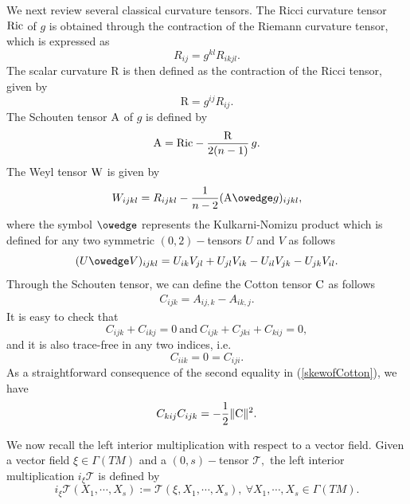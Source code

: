 \documentclass[10pt,leqno,oneside]{amsart}
\begin{document}
        We next review several classical curvature tensors. The Ricci curvature tensor $ {\rm Ric}$ of $g$ is obtained through the contraction of the Riemann curvature tensor, which is expressed as
        \[R_{ij}=g^{kl} R_{ikjl}.\]
        The scalar curvature \(\text{R}\) is then defined as the contraction of the Ricci tensor, given by
        \[\text{R}=g^{ij}R_{ij}.\]
        The Schouten tensor $ {\rm A}$ of $g$ is defined by
        \begin{equation*}
              {\rm A}={\rm Ric}-\frac{{\rm R}}{2(n-1)}\,g.
        \end{equation*}
        The Weyl tensor $\rm{W}$ is given by
                \begin{equation*}\label{decompofR}
                        W_{ijkl}=R_{i j k l} - \frac{1}{n-2}({\rm A}\owedge  g)_{ijkl},
                \end{equation*}
        where the symbol $\owedge$ represents the Kulkarni-Nomizu product which is defined for any two symmetric $(0,2)-$tensors $U$ and $V$ as follows
        $$(U \owedge V)_{i j k l}=U_{ik}V_{jl}+U_{jl}V_{ik}-U_{il}V_{jk}-U_{jk}V_{il}.$$
        Through the Schouten tensor, we can define the Cotton tensor $ {\rm C}$ as follows
                \begin{eqnarray}\label{Cotton}
                        C_{ijk}=A_{ij,k}-A_{ik,j}.
                \end{eqnarray}
         It is easy to check that
                         \begin{equation}\label{skewofCotton}
                         C_{ijk}+ C_{ikj}=0 ~\text{and}~ C_{ijk}+C_{jki}+C_{kij}=0,
                        \end{equation}
         and it is also trace-free in any two indices, i.e.
                \begin{equation}\label{vofC}C_{iik}=0=C_{iji}.\end{equation}
         As a straightforward consequence of the second equality in (\ref{skewofCotton}), we have
                \begin{equation}\label{halfC}
                  C_{kij}C_{ijk}=-\frac{1}{2}\|{\rm C}\|^2.
                \end{equation}

         We now recall the left interior multiplication with respect to a vector field. Given a vector field $\xi\in\Gamma(TM)$ and a $(0,s)-$tensor $\mathcal{T},$ the left interior multiplication $i_{\xi}{\mathcal{T}}$ is defined by
          $$i_{\xi}{\mathcal{T}}(X_1,\cdots,X_s):={\mathcal{T}}(\xi,X_1,\cdots,X_s), ~\forall X_1,\cdots,X_s\in\Gamma(TM).$$
\end{document}
